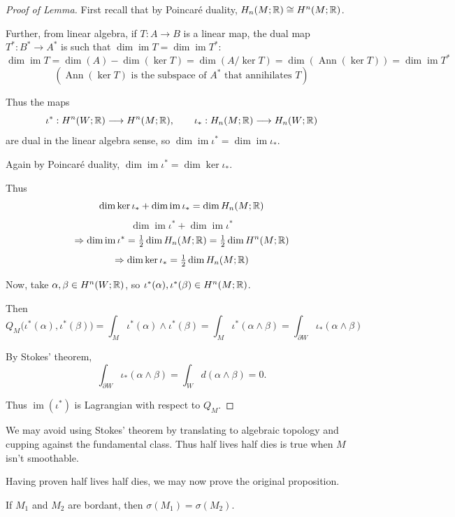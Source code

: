 \documentclass[main]{subfiles}
\begin{document}
\begin{proof}[Proof of Lemma]
First recall that by Poincar\'e duality, $H_n(M;\mathbb R) \cong H^n(M;\mathbb R)$.

Further, from linear algebra, if $T : A \to B$ is a linear map, the dual map $T^\ast : B^\ast \to A^\ast$ is such that $\dim \operatorname{im} T = \dim \operatorname{im} T^\ast$:
\[
\dim \operatorname{im} T = \dim(A) - \dim(\ker T) = \dim(A/\ker T) = \dim(\operatorname{Ann}(\ker T)) = \dim \operatorname{im} T^\ast
\]
\[
\left(\operatorname{Ann}(\ker T) \text{ is the subspace of } A^\ast \text{ that annihilates } T\right)
\]

Thus the maps
\[
\iota^\ast : H^n(W;\mathbb R) \longrightarrow H^n(M;\mathbb R), \qquad \iota_\ast : H_n(M;\mathbb R) \longrightarrow H_n(W;\mathbb R)
\]
are dual in the linear algebra sense, so $\dim \operatorname{im} \iota^\ast = \dim \operatorname{im} \iota_\ast$.

Again by Poincar\'e duality, $\dim \operatorname{im} \iota^\ast = \dim \ker \iota_\ast$.

Thus
\[
\dim \operatorname{ker} \iota_\ast + \dim \operatorname{im} \iota_\ast = \dim H_n(M;\mathbb R)
\]
\[
\dim \operatorname{im} \iota^\ast + \dim \operatorname{im} \iota^\ast
\]
\[
\Rightarrow \dim \operatorname{im} \iota^\ast = \tfrac12 \dim H_n(M;\mathbb R) = \tfrac12 \dim H^n(M;\mathbb R)
\]
\[
\Rightarrow \dim \operatorname{ker} \iota_\ast = \tfrac12 \dim H_n(M;\mathbb R)
\]

Now, take $\alpha,\beta \in H^n(W;\mathbb R)$, so $\iota^\ast(\alpha), \iota^\ast(\beta) \in H^n(M;\mathbb R)$.

Then
\[
Q_M\big(\iota^\ast(\alpha), \iota^\ast(\beta)\big) = \int_M \iota^\ast(\alpha)\wedge\iota^\ast(\beta) = \int_M \iota^\ast(\alpha\wedge\beta) = \int_{\partial W} \iota_\ast(\alpha\wedge\beta)
\]

By Stokes' theorem,
\[
\int_{\partial W} \iota_\ast(\alpha\wedge\beta) = \int_W d(\alpha\wedge\beta) = 0.
\]

Thus $\operatorname{im}(\iota^\ast)$ is Lagrangian with respect to $Q_M$. \qedhere
\end{proof}

\begin{remark}
We may avoid using Stokes' theorem by translating to algebraic topology and cupping against the fundamental class. Thus half lives half dies is true when $M$ isn't smoothable.
\end{remark}

Having proven half lives half dies, we may now prove the original proposition.

\begin{proposition*}
If $M_1$ and $M_2$ are bordant, then $\sigma(M_1) = \sigma(M_2)$.
\end{proposition*}
\end{document}
